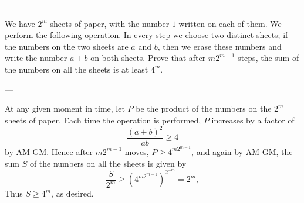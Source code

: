 
---

We have $2^m$ sheets of paper, with the number $1$ written on each of them. We perform the following operation. In every step we choose two distinct sheets; if the numbers on the two sheets are $a$ and $b$, then we erase these numbers and write the number $a+b$ on both sheets. Prove that after $m2^{m-1}$ steps, the sum of the numbers on all the sheets is at least $4^m$.

---

At any given moment in time, let $P$ be the product of the numbers on the $2^m$ sheets of paper. Each time the operation is performed, $P$ increases by a factor of \[\frac{(a+b)^2}{ab}\ge4\]
by AM-GM. Hence after $m2^{m-1}$ moves, $P\ge4^{m2^{m-1}}$, and again by AM-GM, the sum $S$ of the numbers on all the sheets is given by \[\frac S{2^m}\ge\left(4^{m2^{m-1}}\right)^{2^{-m}}=2^m,\]
Thus $S\ge4^m$, as desired.

